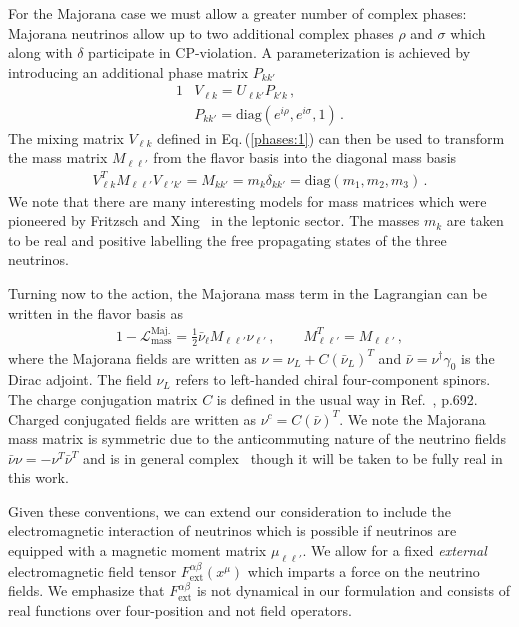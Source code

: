 \documentclass{ws-ijmpa}
\newcommand{\req}[1]{Eq.\,(\ref{#1})}
\begin{document}
For the Majorana case we must allow a greater number of complex phases: Majorana neutrinos allow up to two additional complex phases $\rho$ and $\sigma$ which along with $\delta$ participate in CP-violation. A parameterization is achieved by introducing an additional phase matrix $P_{kk'}$
\begin{alignat}{1}
\label{phases:1} &V_{\ell k} = U_{\ell k'}P_{k'k}\,,\\
\label{phases:3} &P_{kk'} = \mathrm{diag}(e^{i\rho},e^{i\sigma},1)\,.
\end{alignat}
The mixing matrix $V_{\ell k}$ defined in \req{phases:1} can then be used to transform the mass matrix $M_{\ell\ell'}$ from the flavor basis into the diagonal mass basis 
\begin{align}
\label{diag:1}
V_{\ell k}^{T}M_{\ell\ell'}V_{\ell'k'} = M_{kk'} = m_{k}\delta_{kk'} = \mathrm{diag}(m_{1},m_{2},m_{3})\,.
\end{align}
We note that there are many interesting models for mass matrices which were pioneered by Fritzsch and Xing~\cite{Fritzsch:1995dj,Fritzsch:1998xs,Fritzsch:1999ee,Xing:2000ik} in the leptonic sector. The masses $m_{k}$ are taken to be real and positive labelling the free propagating states of the three neutrinos.

Turning now to the action, the Majorana mass term in the Lagrangian can be written in the flavor basis as
\begin{alignat}{1}
\label{mass:1} -\mathcal{L}_{\mathrm{mass}}^{\mathrm{Maj.}}=\frac{1}{2}\bar\nu_{\ell}M_{\ell\ell'}\nu_{\ell'}\,,\qquad
M_{\ell\ell'}^{T}=M_{\ell\ell'}\,,
\end{alignat}
where the Majorana fields are written as $\nu=\nu_{L}+C(\bar\nu_{L})^{T}$ and $\bar\nu=\nu^{\dag}\gamma_{0}$ is the Dirac adjoint. The field $\nu_{L}$ refers to left-handed chiral four-component spinors. The charge conjugation matrix $C$ is defined in the usual way in Ref.~, p.692. Charged conjugated fields are written as $\nu^{c}=C(\bar\nu)^{T}$. We note the Majorana mass matrix is symmetric due to the anticommuting nature of the neutrino fields $\bar\nu\nu=-\nu^{T}\bar\nu^{T}$ and is in general complex~\cite{Adhikary:2013bma,giunti2007fundamentals} though it will be taken to be fully real in this work.

Given these conventions, we can extend our consideration to include the electromagnetic interaction of neutrinos which is possible if neutrinos are equipped with a magnetic moment matrix $\mu_{\ell\ell'}$. We allow for a fixed \emph{external} electromagnetic field tensor $F^{\alpha\beta}_\mathrm{ext}(x^{\mu})$ which imparts a force on the neutrino fields. We emphasize that $F^{\alpha\beta}_\mathrm{ext}$ is not dynamical in our formulation and consists of real functions over four-position and not field operators.
\end{document}
